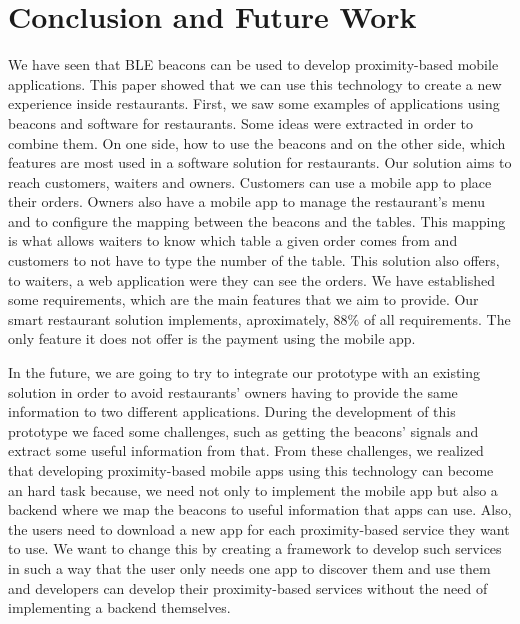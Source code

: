 
\section{Conclusion and Future Work}
\label{sec:conclusion_and_future_work}
We have seen that BLE beacons can be used to develop proximity-based
mobile applications. This paper showed that we can use this technology
to create a new experience inside restaurants.
First, we saw some examples of applications using beacons and software
for restaurants. Some ideas were extracted in order to combine them.
On one side, how to use the beacons and on the other side, which
features are most used in a software solution for restaurants.
Our solution aims to reach customers, waiters and owners.
Customers can use a mobile app to place their orders.
Owners also have a mobile app to manage the restaurant's menu and to
configure the mapping between the beacons and the tables.
This mapping is what allows waiters to know which table a given order
comes from
and customers to not have to type the number of the table.
This solution also offers, to waiters, a web application were they
can see the orders.
We have established some requirements, which are the main
features that we aim to provide.
Our smart restaurant solution implements, aproximately,
88\% of all requirements. The only feature it does not offer is
the payment using the mobile app.

In the future, we are going to try to integrate our
prototype with an existing solution in order to avoid
restaurants' owners having to provide the same information
to two different applications. During the development
of this prototype we faced some challenges, such as
getting the beacons' signals and extract some useful
information from that. From these challenges, we
realized that developing proximity-based mobile
apps using this technology can become an hard task
because, we need not only to implement the mobile app
but also a backend where we map the beacons to
useful information that apps can use. Also, the users
need to download a new app for each proximity-based
service they want to use. We want to change this
by creating a framework to develop such services
in such a way that the user only needs one app
to discover them and use them and developers
can develop their proximity-based services
without the need of implementing a backend
themselves.
